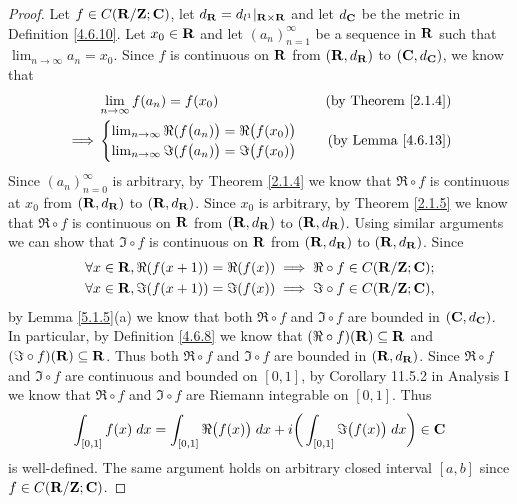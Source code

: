\begin{proof}
    Let \(f \in C(\mathbf{R} / \mathbf{Z} ; \mathbf{C})\), let \(d_{\mathbf{R}} = d_{l^1}|_{\mathbf{R} \times \mathbf{R}}\) and let \(d_{\mathbf{C}}\) be the metric in Definition \ref{4.6.10}.
    Let \(x_0 \in \mathbf{R}\) and let \((a_n)_{n = 1}^\infty\) be a sequence in \(\mathbf{R}\) such that \(\lim_{n \to \infty} a_n = x_0\).
    Since \(f\) is continuous on \(\mathbf{R}\) from \((\mathbf{R}, d_{\mathbf{R}})\) to \((\mathbf{C}, d_{\mathbf{C}})\), we know that
    \begin{align*}
                 & \lim_{n \to \infty} f(a_n) = f(x_0)                                           & \text{(by Theorem \ref{2.1.4})} \\
        \implies & \begin{cases}
                       \lim_{n \to \infty} \Re(f\big(a_n)\big) = \Re\big(f(x_0)\big) \\
                       \lim_{n \to \infty} \Im(f\big(a_n)\big) = \Im\big(f(x_0)\big)
                   \end{cases} & \text{(by Lemma \ref{4.6.13})}
    \end{align*}
    Since \((a_n)_{n = 0}^\infty\) is arbitrary, by Theorem \ref{2.1.4} we know that \(\Re \circ f\) is continuous at \(x_0\) from \((\mathbf{R}, d_{\mathbf{R}})\) to \((\mathbf{R}, d_{\mathbf{R}})\).
    Since \(x_0\) is arbitrary, by Theorem \ref{2.1.5} we know that \(\Re \circ f\) is continuous on \(\mathbf{R}\) from \((\mathbf{R}, d_{\mathbf{R}})\) to \((\mathbf{R}, d_{\mathbf{R}})\).
    Using similar arguments we can show that \(\Im \circ f\) is continuous on \(\mathbf{R}\) from \((\mathbf{R}, d_{\mathbf{R}})\) to \((\mathbf{R}, d_{\mathbf{R}})\).
    Since
    \begin{align*}
         & \forall x \in \mathbf{R}, \Re(f(x + 1)) = \Re(f(x)) \implies \Re \circ f \in C(\mathbf{R} / \mathbf{Z} ; \mathbf{C}); \\
         & \forall x \in \mathbf{R}, \Im(f(x + 1)) = \Im(f(x)) \implies \Im \circ f \in C(\mathbf{R} / \mathbf{Z} ; \mathbf{C}),
    \end{align*}
    by Lemma \ref{5.1.5}(a) we know that both \(\Re \circ f\) and \(\Im \circ f\) are bounded in \((\mathbf{C}, d_{\mathbf{C}})\).
    In particular, by Definition \ref{4.6.8} we know that \((\Re \circ f)(\mathbf{R}) \subseteq \mathbf{R}\) and \((\Im \circ f)(\mathbf{R}) \subseteq \mathbf{R}\).
    Thus both \(\Re \circ f\) and \(\Im \circ f\) are bounded in \((\mathbf{R}, d_{\mathbf{R}})\).
    Since \(\Re \circ f\) and \(\Im \circ f\) are continuous and bounded on \([0, 1]\), by Corollary 11.5.2 in Analysis I we know that \(\Re \circ f\) and \(\Im \circ f\) are Riemann integrable on \([0, 1]\).
    Thus
    \[
        \int_{[0, 1]} f(x) \; dx = \int_{[0, 1]} \Re\big(f(x)\big) \; dx + i \bigg(\int_{[0, 1]} \Im\big(f(x)\big) \; dx\bigg) \in \mathbf{C}
    \]
    is well-defined.
    The same argument holds on arbitrary closed interval \([a, b]\) since \(f \in C(\mathbf{R} / \mathbf{Z} ; \mathbf{C})\).
\end{proof}

